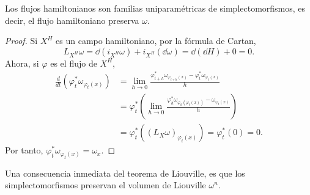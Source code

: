 \begin{prop}
  Los flujos hamiltonianos son familias uniparamétricas de simplectomorfismos, es decir, el flujo hamiltoniano preserva $\omega$. 
\end{prop}
\begin{proof}
  Si $X^H$ es un campo hamiltoniano, por la fórmula de Cartan,
  \begin{equation*}
    L_{X^H}\omega= \dd (i_{X^H}\omega) + i_{X^H}(\dd \omega) = \dd (\dd H) + 0 = 0.
  \end{equation*}
  Ahora, si $\varphi$ es el flujo de $X^H$,
  \begin{align*}
    \frac{d}{dt}(\varphi^*_t\omega_{\varphi_t(x)})&=\lim_{h\rightarrow 0}\frac{\varphi^*_{t+h}\omega_{\varphi_{t+h}(x)}-\varphi^*_t\omega_{\varphi_t(x)}}{h}\\ &=\varphi^*_t\left( \lim_{h\rightarrow 0}\frac{\varphi^*_h\omega_{\varphi_h(\varphi_t(x))}-\omega_{\varphi_t(x)}}{h}\right)\\ &=\varphi_t^*((L_X\omega)_{\varphi_t(x)})=\varphi^*_t(0)=0. 
  \end{align*}
  Por tanto, $\varphi^*_t\omega_{\varphi_t(x)}=\omega_x$.
\end{proof}
Una consecuencia inmediata del teorema de Liouville, es que los simplectomorfismos preservan el volumen de Liouville $\omega^n$.


